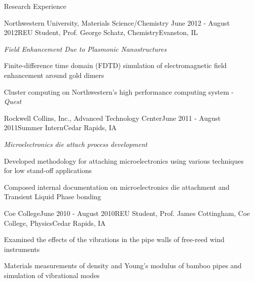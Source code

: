 \documentclass{resume} %
\begin{document}
\begin{rSection}{Research Experience}

\begin{samepage}
\begin{rSubsection}{Northwestern University, Materials Science/Chemistry }{June 2012 - August 2012}{REU Student, Prof. George Schatz, Chemistry}{Evanston, IL}

\item {\em Field Enhancement Due to Plasmonic Nanostructures}
\item Finite-difference time domain (FDTD) simulation of electromagnetic field enhancement around gold dimers
\item Cluster computing on Northwestern's high performance computing system - {\em Quest}
\end{rSubsection}
\end{samepage}


\begin{rSubsection}{Rockwell Collins, Inc., Advanced Technology Center}{June 2011 - August 2011}{Summer Intern}{Cedar Rapids, IA}
\item {\em Microelectronics die attach process development}
\item Developed methodology for attaching microelectronics using various techniques for low stand-off applications
\item Composed internal documentation on microelectronics die attachment and Transient Liquid Phase bonding
\end{rSubsection}


\begin{samepage}
\begin{rSubsection}{Coe College}{June 2010 - August 2010}{REU Student, Prof. James Cottingham, Coe College, Physics}{Cedar Rapids, IA}
\item Examined the effects of the vibrations in the pipe walls of free-reed wind instruments
\item Materials measurements of density and Young's modulus of bamboo pipes and simulation of vibrational modes
\end{rSubsection}
\end{samepage}

\end{rSection}
\end{document}
